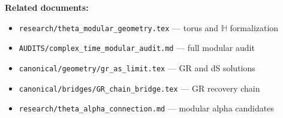 \documentclass[11pt,a4paper]{article}
\begin{document}
\bigskip

\noindent\textbf{Related documents:}
\begin{itemize}
  \item \texttt{research/theta\_modular\_geometry.tex} — torus and $\mathbb{H}$ formalization
  \item \texttt{AUDITS/complex\_time\_modular\_audit.md} — full modular audit
  \item \texttt{canonical/geometry/gr\_as\_limit.tex} — GR and dS solutions
  \item \texttt{canonical/bridges/GR\_chain\_bridge.tex} — GR recovery chain
  \item \texttt{research/theta\_alpha\_connection.md} — modular alpha candidates
\end{itemize}
\end{document}

